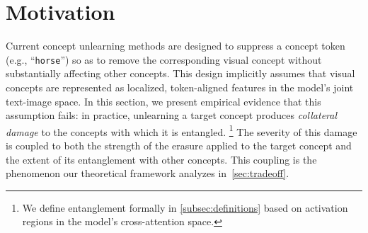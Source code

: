 \section{Motivation}
\label{sec:motivation} 
Current concept unlearning methods are designed to suppress a concept token (e.g., ``\texttt{horse}'') 
so as to remove the corresponding visual concept without substantially affecting other concepts. This design implicitly assumes that visual concepts are represented as localized, token-aligned features in the model's joint text-image space.
In this section, we present empirical evidence that this assumption fails: 
in practice, unlearning a target concept produces 
\emph{collateral damage} to the concepts with which it is entangled. 
\footnote{We define entanglement formally in \cref{subsec:definitions} based on activation regions in the model's cross-attention space.}
The severity of this damage is coupled to both the strength of the erasure applied to the target concept and the extent of its entanglement with other concepts.
This coupling is the phenomenon our theoretical framework analyzes in~\cref{sec:tradeoff}.


